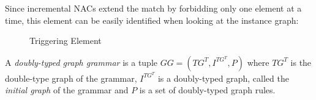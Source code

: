 \begin{example}
  Since incremental NACs extend the match by forbidding only one element at a time, this element can be easily identified when looking at the instance graph: 
\end{example}

\begin{figure}[!ht]
  \centering
  \caption{Triggering Element}\label{fig:process:triggering-element}
\end{figure}

\begin{definition} A \emph{doubly-typed graph grammar} is a tuple $GG = \left(TG^T, I^{TG^T},P \right)$ where $TG^T$ is the double-type graph of the grammar, $I^{TG^T}$ is a doubly-typed graph, called the \emph{initial graph} of the grammar and $P$ is a set of doubly-typed graph rules.
\end{definition}


